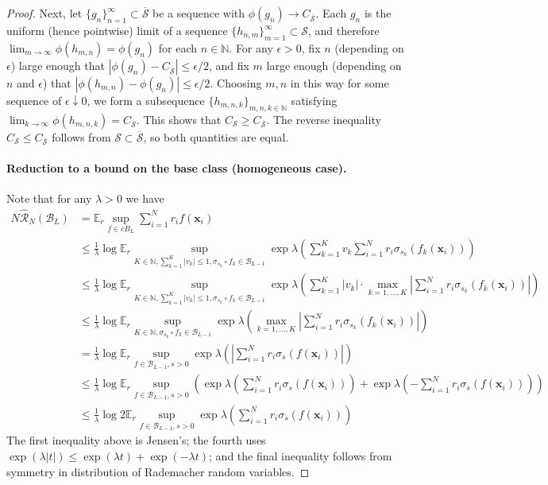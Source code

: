 \documentclass{article}
\def\vx{{\bm{x}}}
\def\cB{{\mathcal{B}}}
\def\cR{{\mathcal{R}}}
\def\cS{{\mathcal{S}}}
\def\bE{{\mathbb{E}}}
\def\bN{{\mathbb{N}}}
\begin{document}
\begin{appendices}
\begin{proof}
    Next, let $\{ g_n \}_{n=1}^\infty \subset \overline{\cS}$ be a sequence with $\phi(g_n) \to C_{\overline{\cS}}$. Each $g_n$ is the uniform (hence pointwise) limit of a sequence $\{ h_{n,m} \}_{m=1}^\infty \subset \cS$, and therefore $\lim_{m \to \infty} \phi(h_{m,n}) = \phi(g_n)$ for each $n \in \bN$. For any $\epsilon > 0$, fix $n$ (depending on $\epsilon$) large enough that $|\phi(g_n) - C_{\overline{\cS}}| \leq \epsilon/2$, and fix $m$ large enough (depending on $n$ and $\epsilon$) that $|\phi(h_{m,n}) - \phi(g_n)| \leq \epsilon/2$. Choosing $m,n$ in this way for some sequence of $\epsilon \downarrow 0$, we form a subsequence $\{ h_{m,n,k} \}_{m,n,k \in \bN}$ satisfying $\lim_{k \to \infty} \phi(h_{m,n,k}) = C_{\overline{\cS}}$. This shows that $C_{\cS} \geq C_{\overline{\cS}}$. The reverse inequality  $C_{\cS} \leq C_{\overline{\cS}}$ follows from $\cS \subset \overline{\cS}$, so both quantities are equal.
    
    
    \paragraph{Reduction to a bound on the base class (homogeneous case).} Note that for any $\lambda > 0$ we have
    \begin{align} 
        N \widehat{\cR}_N(\cB_L) &= \bE_r \sup_{f \in cB_L} \sum_{i=1}^N r_i f(\vx_i)  \\
        &\leq \frac{1}{\lambda} \log \bE_r \sup_{K \in \bN, \sum_{k=1}^K |v_k|  \leq 1, \sigma_{s_k} \circ f_k \in \cB_{L-1}} \exp \lambda \left( \sum_{k=1}^K v_k \sum_{i=1}^N r_i  \sigma_{s_k} (f_k(\vx_i)) \right) \label{eq:rad_bound_init} \\
        &\leq \frac{1}{\lambda} \log \bE_r \sup_{K \in \bN, \sum_{k=1}^K |v_k| \leq 1, \sigma_{s_k} \circ f_k \in \cB_{L-1}} \exp \lambda \left(  \sum_{k=1}^K |v_k| \cdot \max_{k=1, \dots, K} \left| \sum_{i=1}^N r_i  \sigma_{s_k}(f_k(\vx_i)) \right| \right) \\
        &\leq \frac{1}{\lambda} \log \bE_r \sup_{K \in \bN, \sigma_{s_k} \circ f_k \in \cB_{L-1}} \exp \lambda \left( \max_{k=1, \dots, K} \left| \sum_{i=1}^N r_i  \sigma_{s_k} (f_k(\vx_i)) \right| \right) \\
        &= \frac{1}{\lambda} \log \bE_r \sup_{f \in \cB_{L-1}, s > 0} \exp \lambda \left( \left| \sum_{i=1}^N r_i \sigma_s(f(\vx_i)) \right| \right) \\
        &\leq \frac{1}{\lambda} \log \bE_r \sup_{f \in \cB_{L-1}, s > 0} \left( \exp \lambda \left( \sum_{i=1}^N r_i \sigma_s(f(\vx_i))  \right) + \exp \lambda \left( -\sum_{i=1}^N r_i \sigma_s(f(\vx_i))  \right)\right) \\
        &\leq \frac{1}{\lambda} \log 2 \bE_r \sup_{f \in \cB_{L-1}, s > 0} \exp \lambda \left( \sum_{i=1}^N r_i \sigma_s (f(\vx_i))  \right) \label{eq:rad_bound_pre_contraction}
    \end{align}
    The first inequality above is Jensen's; the fourth uses $\exp(\lambda |t|) \leq \exp(\lambda t) + \exp(-\lambda t)$; and the final inequality follows from symmetry in distribution of Rademacher random variables. 
    

\end{proof}
\end{appendices}
\end{document}
